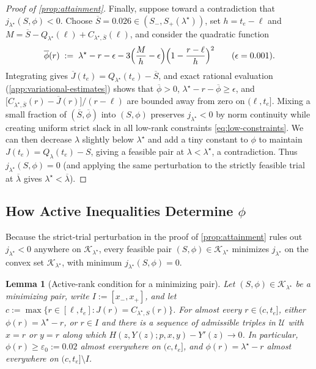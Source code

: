 \documentclass[11pt]{article}
\numberwithin{equation}{section}
\theoremstyle{plain}
\newtheorem{lemma}[theorem]{Lemma}
\theoremstyle{definition}
\newcommand{\1}{\mathbf{1}}
\newcommand{\calK}{\mathcal{K}}
\newcommand{\calU}{\mathcal{U}}
\begin{document}
\begin{proof}[Proof of {\cref{prop:attainment}}]
Finally, suppose toward a contradiction that $j_{\lambda^\star}(S, \phi) < 0$. Choose $\overline{S} = 0.026 \in (S_-, S_+(\lambda^\star))$, set $h = t_e - \ell$ and $M = \overline{S} - Q_{\lambda^\star}(\ell) + C_{\lambda^\star, \overline{S}}(\ell)$, and consider the quadratic function
\[
  \overline{\phi}(r) \;:=\; \lambda^\star - r - \epsilon - 3\Bigl(\frac{M}{h} - \epsilon\Bigr)\Bigl(1 - \frac{r - \ell}{h}\Bigr)^2
  \qquad (\epsilon = 0.001).
\]
Integrating gives $\overline{J}(t_e) = Q_{\lambda^\star}(t_e) - \overline{S}$, and exact rational evaluation (\cref{app:variational-estimates}) shows that $\overline{\phi} > 0$, $\lambda^\star - r - \overline{\phi} \ge \epsilon$, and $\bigl[C_{\lambda^\star, \overline{S}}(r) - \overline{J}(r)\bigr]/(r - \ell)$ are bounded away from zero on $(\ell, t_e]$. Mixing a small fraction of $(\overline{S}, \overline{\phi})$ into $(S, \phi)$ preserves $j_{\lambda^\star} < 0$ by norm continuity while creating uniform strict slack in all low-rank constraints \cref{eq:low-constraints}. We can then decrease $\lambda$ slightly below $\lambda^\star$ and add a tiny constant to $\phi$ to maintain $J(t_e) = Q_\lambda(t_e) - S$, giving a feasible pair at $\lambda < \lambda^\star$, a contradiction. Thus $j_{\lambda^\star}(S, \phi) = 0$ (and applying the same perturbation to the strictly feasible trial at $\overline{\lambda}$ gives $\lambda^\star < \overline{\lambda}$).
\end{proof}

\subsection{How Active Inequalities Determine \texorpdfstring{$\phi$}{phi}}
\label{app:shape}

Because the strict-trial perturbation in the proof of \cref{prop:attainment} rules out $j_{\lambda^\star} < 0$ anywhere on $\calK_{\lambda^\star}$, every feasible pair $(S, \phi) \in \calK_{\lambda^\star}$ minimizes $j_{\lambda^\star}$ on the convex set $\calK_{\lambda^\star}$, with minimum $j_{\lambda^\star}(S, \phi) = 0$.

\begin{lemma}[Active-rank condition for a minimizing pair]
\label{lem:first-order}
Let $(S, \phi) \in \calK_{\lambda^\star}$ be a minimizing pair, write $I := [x_-, x_+]$, and let $c := \max\{r \in [\ell, t_e] : J(r) = C_{\lambda^\star, S}(r)\}$. For almost every $r \in (c, t_e]$, either $\phi(r) = \lambda^\star - r$, or $r \in I$ and there is a sequence of admissible triples in $\calU$ with $x = r$ or $y = r$ along which $H(z, Y(z); p, x, y) - Y'(z) \to 0$. In particular, $\phi(r) \ge \varepsilon_0 := 0.02$ almost everywhere on $(c, t_e]$, and $\phi(r) = \lambda^\star - r$ almost everywhere on $(c, t_e] \setminus I$.
\end{lemma}
\end{document}
